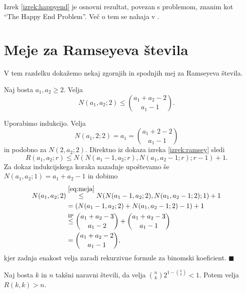 \documentclass[twoside,11pt]{article}
\begin{document}
Izrek \ref{izrek:happyend} je osnovni rezultat, povezan s problemom, znanim 
kot ``The Happy End Problem''. Več o tem se nahaja v \cite[poglavje 29]{color}.

\section{Meje za Ramseyeva števila}

\hspace{\parindent}V tem razdelku dokažemo nekaj zgornjih in spodnjih mej za Ramseyeva števila.

\begin{trditev}
    Naj bosta $a_1,a_2 \ge 2$. Velja
    \[
        N(a_1, a_2; 2) \le \binom{a_1 + a_2 -2}{a_1-1}.
    \]
\end{trditev}

\begin{dokaz}
    Uporabimo indukcijo. Velja
    \[
        N(a_1, 2; 2) = a_1 = \binom{a_1+2-2}{a_1-1}
    \]
    in podobno za $N(2,a_2; 2)$. Direktno iz dokaza 
    izreka \ref{izrek:ramsey} sledi
    \begin{equation}
        R(a_1, a_2; r) \le N(N(a_1-1,a_2;r), N(a_1,a_2-1;r);r-1) + 1.
        \label{eq:meja}
    \end{equation}
    Za dokaz indukcijskega koraka nazadnje upoštevamo še $N(a_1,a_2;1) = a_1 + a_2 - 1$ in dobimo
    \begin{align*}
        N(a_1, a_2; 2) &\overset{\eqref{eq:meja}}{\le} N(N(a_1-1,a_2;2), N(a_1,a_2-1;2);1) +1\\
        &= (N(a_1-1,a_2;2) + N(a_1,a_2-1; 2) - 1) + 1 \\
        &\overset{{\text{IP}}}{\le} \binom{a_1 + a_2 -3}{a_1-2} + \binom{a_1 + a_2 -3}{a_1-1} \\
        &=\binom{a_1+a_2-2}{a_1-1},
    \end{align*}
    kjer zadnja enakost velja zaradi rekurzivne formule za binomski koeficient. \hfill $\blacksquare$
\end{dokaz} 

\begin{izrek}
    Naj bosta $k$ in $n$ takšni naravni števili, da velja 
    $\binom{n}{k}2^{1-\binom{k}{2}} < 1$. Potem velja 
    $R(k,k) > n$.
\end{izrek}
\end{document}
